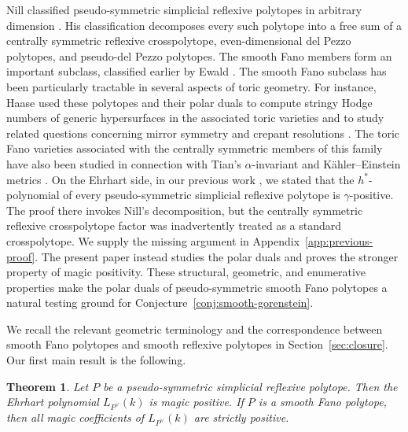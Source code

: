 \documentclass[10pt,a4paper]{amsart}
\newtheorem{Theorem}{Theorem}[section]
\theoremstyle{definition}
\begin{document}
Nill classified pseudo-symmetric simplicial reflexive polytopes in
arbitrary dimension \cite{NillPseudoSymmetric}.  His classification
decomposes every such polytope into a free sum of a centrally symmetric
reflexive crosspolytope, even-dimensional del Pezzo polytopes, and
pseudo-del Pezzo polytopes.  The smooth Fano members form an important
subclass, classified earlier by Ewald
\cite{Ewald,EwaldBook}.
The smooth Fano subclass has been particularly tractable in several
aspects of toric geometry.  
For
instance, Haase used these polytopes and their polar duals to compute
stringy Hodge numbers of generic hypersurfaces in the associated toric
varieties and to study related questions concerning mirror symmetry and
crepant resolutions \cite{HaaseThesis}.  The toric Fano varieties
associated with the centrally symmetric members of this family have also
been studied in connection with Tian's $\alpha$-invariant and
K\"ahler--Einstein metrics \cite{BatyrevSelivanova,SongAlpha}.  
On the Ehrhart side, in our previous work
\cite[Theorem~5.8]{OhsugiTsuchiyaLocally}, we stated that the
$h^*$-polynomial of every pseudo-symmetric simplicial reflexive polytope
is $\gamma$-positive.
The proof there invokes Nill's decomposition, but the centrally
symmetric reflexive crosspolytope factor was inadvertently treated as
a standard crosspolytope.
We supply the missing argument in Appendix~\ref{app:previous-proof}.
The present paper instead studies the polar duals and proves the
stronger property of magic positivity.
These structural, geometric,
and enumerative properties make the polar duals of pseudo-symmetric
smooth Fano polytopes a natural testing ground for
Conjecture~\ref{conj:smooth-gorenstein}.

We recall the relevant geometric terminology and the correspondence
between smooth Fano polytopes and smooth reflexive polytopes in
Section~\ref{sec:closure}.  Our first main result is the following.


\begin{Theorem}\label{thm:pseudo-symmetric-main}
Let $P$ be a pseudo-symmetric simplicial reflexive polytope.
Then the Ehrhart polynomial $L_{P^\vee}(k)$ is magic positive.
If $P$ is a smooth Fano polytope, then all magic coefficients of
$L_{P^\vee}(k)$ are strictly positive.
\end{Theorem}
\end{document}
